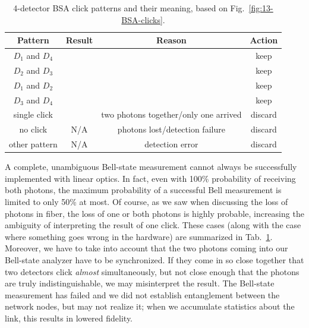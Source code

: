 \begin{table}
    \setcellgapes{3pt}
    \renewcommand\theadfont{}
    \makegapedcells
    \centering
    \begin{tabular}{cccc}
    \hline
        \textbf{Pattern}  & \textbf{Result} & \textbf{Reason} & \textbf{Action} \\
        \hline
        $D_1$ and $D_4$ & \ket{\Psi^-} & & keep \\
        $D_2$ and $D_3$ & \ket{\Psi^-} & & keep \\
        $D_1$ and $D_2$ & \ket{\Psi^+} & & keep \\
        $D_3$ and $D_4$ & \ket{\Psi^+} & & keep \\
        single click & \ket{\Phi^\pm}  & two photons together/only one arrived & discard \\
        no click & N/A & photons lost/detection failure & discard \\
        other pattern & N/A & detection error & discard \\
        \hline
    \end{tabular}
    \caption[Four-detector BSA click patterns.]{4-detector BSA click patterns and their meaning, based on Fig.~\ref{fig:13-BSA-clicks}.}
    \label{tab:bsa-clicks}
\end{table}

A complete, unambiguous Bell-state measurement cannot always be successfully implemented with linear optics.
In fact, even with 100\% probability of receiving both photons, the maximum probability of a successful Bell measurement is limited to only 50\% at most.
Of course, as we saw when discussing the loss of photons in fiber, the loss of one or both photons is highly probable, increasing the ambiguity of interpreting the result of one click.
These cases (along with the case where something goes wrong in the hardware) are summarized in Tab.~\ref{tab:bsa-clicks}. 
Moreover, we have to take into account that the two photons coming into our Bell-state analyzer have to be synchronized.
If they come in so close together that two detectors click \emph{almost} simultaneously, but not close enough that the photons are truly indistinguishable, we may misinterpret the result.
The Bell-state measurement has failed and we did not establish entanglement between the network nodes, but may not realize it; when we accumulate statistics about the link, this results in lowered fidelity.





